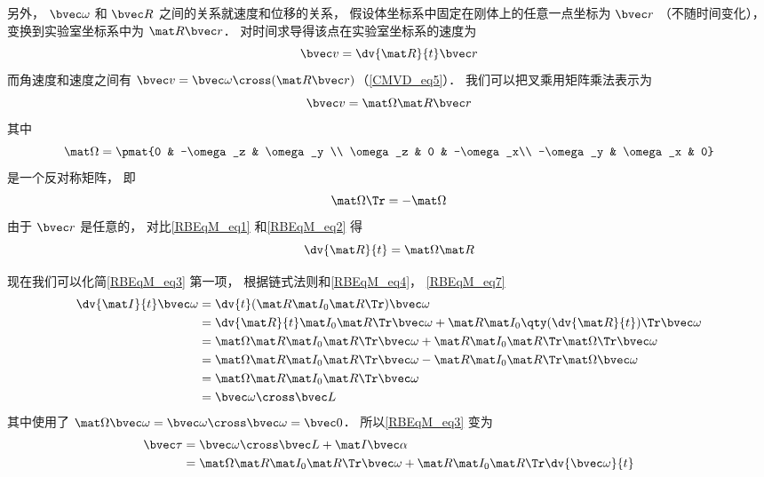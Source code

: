 另外， $\bvec \omega$ 和 $\bvec R$ 之间的关系就速度和位移的关系， 假设体坐标系中固定在刚体上的任意一点坐标为 $\bvec r$ （不随时间变化）， 变换到实验室坐标系中为 $\mat R \bvec r$． 对时间求导得该点在实验室坐标系的速度为
\begin{equation}\label{RBEqM_eq1}
\bvec v = \dv{\mat R}{t} \bvec r
\end{equation}
而角速度和速度之间有 $\bvec v = \bvec \omega \cross (\mat R \bvec r)$（\autoref{CMVD_eq5}）． 我们可以把叉乘用矩阵乘法表示为 %
\begin{equation}\label{RBEqM_eq2}
\bvec v = \mat\Omega \mat R \bvec r
\end{equation}
其中
\begin{equation}
\mat\Omega = \pmat{0 & -\omega_z & \omega_y \\ \omega_z & 0 & -\omega_x\\ -\omega_y & \omega_x & 0}
\end{equation}
是一个反对称矩阵， 即
\begin{equation}\label{RBEqM_eq7}
\mat \Omega\Tr = -\mat \Omega
\end{equation}
由于 $\bvec r$ 是任意的， 对比\autoref{RBEqM_eq1} 和\autoref{RBEqM_eq2} 得
\begin{equation}\label{RBEqM_eq4}
\dv{\mat R}{t} = \mat\Omega \mat R
\end{equation}

现在我们可以化简\autoref{RBEqM_eq3} 第一项， 根据链式法则和\autoref{RBEqM_eq4}， \autoref{RBEqM_eq7}
\begin{equation}
\begin{aligned}
\dv{\mat I}{t}\bvec\omega &= \dv{t}(\mat R \mat I_0 \mat R\Tr)\bvec\omega\\
&= \dv{\mat R}{t} \mat I_0 \mat R\Tr \bvec\omega + \mat R \mat I_0 \qty(\dv{\mat R}{t})\Tr \bvec\omega\\
&= \mat \Omega \mat R \mat I_0 \mat R\Tr \bvec\omega + \mat R \mat I_0 \mat R\Tr \mat \Omega\Tr \bvec\omega\\
&= \mat \Omega \mat R \mat I_0 \mat R\Tr \bvec\omega - \mat R \mat I_0 \mat R\Tr \mat \Omega \bvec\omega\\
&= \mat \Omega \mat R \mat I_0 \mat R\Tr \bvec\omega\\
&= \bvec \omega \cross \bvec L
\end{aligned}
\end{equation}
其中使用了 $\mat \Omega \bvec\omega = \bvec\omega \cross \bvec\omega = \bvec 0$． 所以\autoref{RBEqM_eq3} 变为
\begin{equation}
\begin{aligned}
\bvec\tau &= \bvec\omega \cross \bvec L + \mat I \bvec\alpha\\
&= \mat \Omega \mat R \mat I_0 \mat R\Tr \bvec\omega + \mat R \mat I_0 \mat R\Tr \dv{\bvec\omega}{t}
\end{aligned}
\end{equation}

